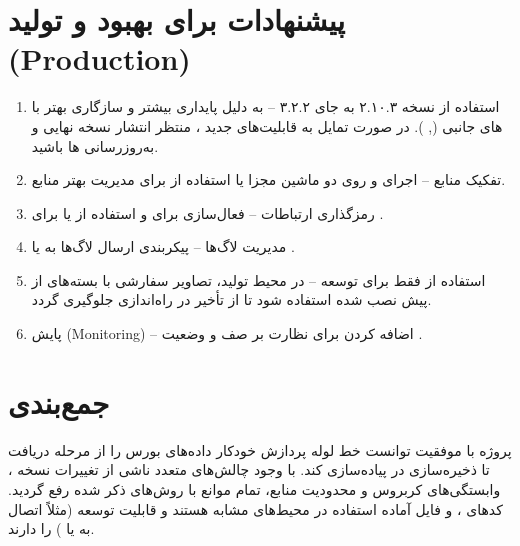 \documentclass[12pt,a4paper]{article}
\begin{document}
\section{پیشنهادات برای بهبود و تولید (Production)}
\begin{enumerate}
\item استفاده از  نسخه ۲.۱۰.۳ به جای ۳.۲.۲ – به دلیل پایداری بیشتر و سازگاری بهتر با های جانبی (, ). در صورت تمایل به قابلیت‌های جدید ، منتظر انتشار نسخه نهایی و به‌روزرسانی ها باشید.
\item تفکیک منابع – اجرای  و  روی دو ماشین مجزا یا استفاده از  برای مدیریت بهتر منابع.
\item رمزگذاری ارتباطات – فعال‌سازی  برای  و استفاده از  یا  برای  .
\item مدیریت لاگ‌ها – پیکربندی ارسال لاگ‌ها به  یا .
\item استفاده از  فقط برای توسعه – در محیط تولید، تصاویر سفارشی با بسته‌های از پیش نصب شده استفاده شود تا از تأخیر در راه‌اندازی جلوگیری گردد.
\item پایش (Monitoring) – اضافه کردن  برای نظارت بر صف  و وضعیت .
\end{enumerate}

\section{جمع‌بندی}
پروژه با موفقیت توانست خط لوله پردازش خودکار داده‌های بورس را از مرحله دریافت تا ذخیره‌سازی در  پیاده‌سازی کند. با وجود چالش‌های متعدد ناشی از تغییرات نسخه ، وابستگی‌های کربروس و محدودیت منابع، تمام موانع با روش‌های ذکر شده رفع گردید. کدهای ،  و فایل  آماده استفاده در محیط‌های مشابه هستند و قابلیت توسعه (مثلاً اتصال به  یا ) را دارند.
\end{document}
